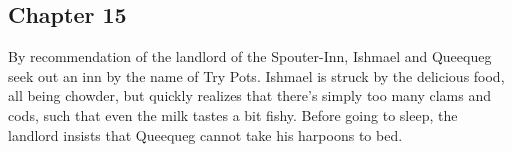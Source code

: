 \subsection{Chapter 15}

By recommendation of the landlord of the Spouter-Inn, Ishmael and Queequeg seek
out an inn by the name of Try Pots. Ishmael is struck by the delicious food,
all being chowder, but quickly realizes that there's simply too many clams and
cods, such that even the milk tastes a bit fishy. Before going to sleep, the
landlord insists that Queequeg cannot take his harpoons to bed.
